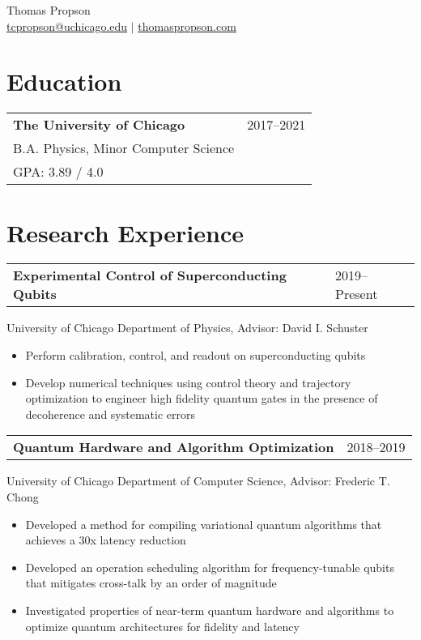 \documentclass[letterpaper, 11pt]{article}
\begin{document}
\begin{center}
{\large Thomas Propson} \\[5pt]
\href{mailto:tcpropson@uchicago.edu}{tcpropson@uchicago.edu} $\vert$
\href{https://thomaspropson.com}{thomaspropson.com}
\end{center}


\flushleft

\section{Education}
\begin{tabular}{@{} L{12cm} @{} R{4.51cm} @{}}
  \textbf{The University of Chicago} & 2017--2021\\
  B.A. Physics, Minor Computer Science &\\
  GPA: 3.89 / 4.0 &\\
\end{tabular}

\section{Research Experience}
\begin{tabular}{@{} L{12cm} @{} R{4.51cm} @{}}
  \textbf{Experimental Control of Superconducting Qubits} & 2019--Present\\
\end{tabular}
University of Chicago Department of Physics, Advisor: David I. Schuster\\
\begin{itemize}
  \item Perform calibration, control, and readout on superconducting qubits
  \item Develop numerical techniques using control theory and trajectory optimization
    to engineer high fidelity quantum gates in the presence of decoherence and systematic errors
\end{itemize}

\begin{tabular}{@{} L{12cm} @{} R{4.51cm} @{}}
  \textbf{Quantum Hardware and Algorithm Optimization} & 2018--2019\\
\end{tabular}
University of Chicago Department of Computer Science, Advisor: Frederic T. Chong
\begin{itemize}
  \item Developed a method for compiling variational quantum algorithms that achieves a 30x latency reduction
  \item Developed an operation scheduling algorithm for frequency-tunable qubits that mitigates cross-talk by an order of magnitude
  \item Investigated properties of near-term quantum hardware and algorithms
    to optimize quantum architectures for fidelity and latency
\end{itemize}
\end{document}
